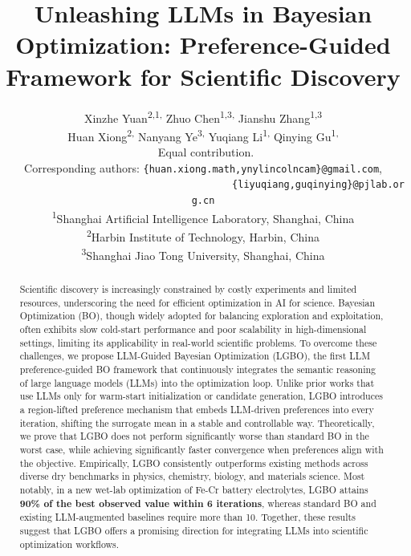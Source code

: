 \documentclass{article} %
\title{Unleashing LLMs in Bayesian Optimization: Preference-Guided Framework for Scientific Discovery}
\author{
Xinzhe Yuan\textsuperscript{2,1,\dag} \hspace{0.2cm}
Zhuo Chen\textsuperscript{1,3,\dag} \hspace{0.2cm}
Jianshu Zhang\textsuperscript{1,3} \\
Huan Xiong\textsuperscript{2, \ddag} \hspace{0.2cm}
Nanyang Ye\textsuperscript{3, \ddag} \hspace{0.2cm}
Yuqiang Li\textsuperscript{1, \ddag} \hspace{0.2cm}
Qinying Gu\textsuperscript{1, \ddag}
\smallskip \\
\small \dag\ Equal contribution. \smallskip \\
\small \ddag Corresponding authors: \texttt{\{huan.xiong.math,ynylincolncam\}@gmail.com}, \\
\small\ \ \ \ \ \ \ \ \ \ \ \ \ \ \ \ \ \ \ \ \ \ \ \ \ \ \ \ \ \ \ \ \ \ \ \ \ \ \ \ \ \texttt{\{liyuqiang,guqinying\}@pjlab.org.cn}\bigskip \\
\textsuperscript{1}Shanghai Artificial Intelligence Laboratory, Shanghai, China \\
\textsuperscript{2}Harbin Institute of Technology, Harbin, China \\
\textsuperscript{3}Shanghai Jiao Tong University, Shanghai, China
}
\begin{document}
\maketitle

\begin{abstract}
Scientific discovery is increasingly constrained by costly experiments and limited resources, underscoring the need for efficient optimization in AI for science. Bayesian Optimization (BO), though widely adopted for balancing exploration and exploitation, often exhibits slow cold-start performance and poor scalability in high-dimensional settings, limiting its applicability in real-world scientific problems. To overcome these challenges, we propose LLM-Guided Bayesian Optimization (LGBO), the first LLM preference-guided BO framework that continuously integrates the semantic reasoning of large language models (LLMs) into the optimization loop. Unlike prior works that use LLMs only for warm-start initialization or candidate generation, LGBO introduces a region-lifted preference mechanism that embeds LLM-driven preferences into every iteration, shifting the surrogate mean in a stable and controllable way. Theoretically, we prove that LGBO does not perform significantly worse than standard BO in the worst case, while achieving significantly faster convergence when preferences align with the objective. Empirically, LGBO consistently outperforms existing methods across diverse dry benchmarks in physics, chemistry, biology, and materials science.  Most notably, in a new wet-lab optimization of Fe-Cr battery electrolytes, LGBO attains \textbf{90\% of the best observed value within 6 iterations}, whereas standard BO and existing LLM-augmented baselines require more than 10. Together, these results suggest that LGBO offers a promising direction for integrating LLMs into scientific optimization workflows.




\end{abstract}
\end{document}
